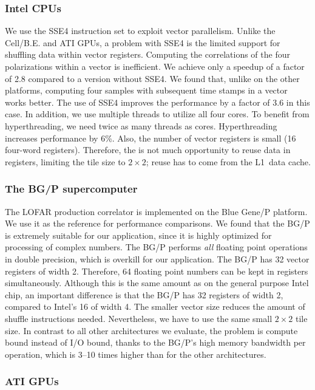 \documentclass{article}
\begin{document}
\subsubsection{Intel CPUs}

We use the SSE4 instruction set to exploit vector parallelism.  
Unlike the Cell/B.E. and ATI GPUs, a
problem with SSE4 is the limited support for shuffling data within
vector registers.  Computing the
correlations of the four polarizations within a vector is
inefficient. We achieve only a speedup of a factor of 2.8 compared to
a version without SSE4.  We found that, unlike on the other platforms,
computing four samples with subsequent time stamps in a vector works
better.  The use of SSE4 improves the performance by a factor of 3.6
in this case.  In addition, we use multiple threads to utilize all
four cores.  To benefit from hyperthreading, we need twice as many
threads as cores.  Hyperthreading increases performance by 6\%.  Also,
the number of vector registers is small (16 four-word registers).
Therefore, the is not much opportunity to reuse data in registers,
limiting the tile size to $2 \times 2$; reuse has to come from the
L1~data cache.



\subsubsection{The BG/P supercomputer}

The LOFAR production correlator is implemented on the Blue Gene/P platform.
We use it as the reference for performance comparisons.
We found that the BG/P is extremely suitable for our application,
since it is highly optimized for processing of complex numbers.
The BG/P performs \emph{all} floating point operations in double
precision, which is overkill for our application.
The BG/P has 32 vector registers of width 2.  Therefore, 64 floating
point numbers can be kept in registers
simultaneously. Although this is the same amount as on the general purpose
Intel chip, an important difference is that the BG/P has 32
registers of width 2, compared to Intel's 16 of width 4.  The smaller
vector size reduces the amount of shuffle instructions needed.
Nevertheless, we have to use the same small $2 \times 2$ tile size.
In contrast to all other architectures we evaluate, the problem is compute
bound instead of I/O bound, thanks to the BG/P's high memory bandwidth per
operation, which is 3--10 times higher than for the other architectures.


\subsubsection{ATI GPUs}
\end{document}
